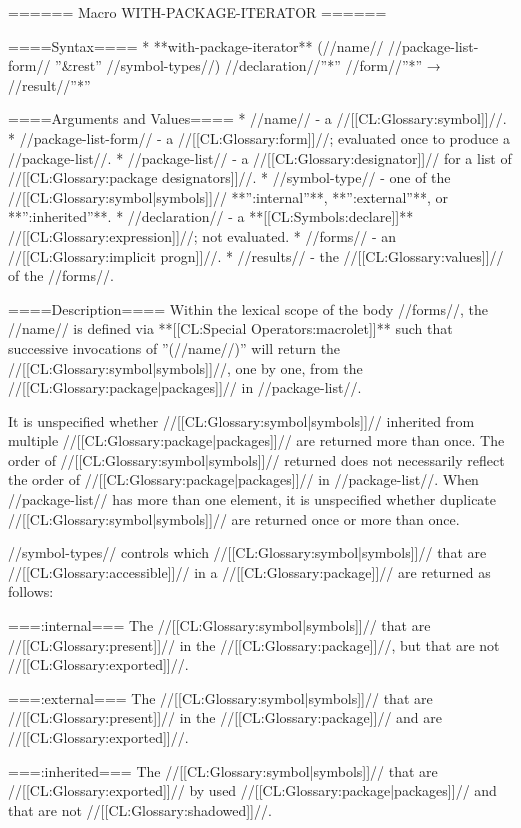 ====== Macro WITH-PACKAGE-ITERATOR ======

====Syntax====
  * **with-package-iterator** (//name// //package-list-form// ''&rest'' //symbol-types//) //declaration//''*'' //form//''*'' → //result//''*''

====Arguments and Values====
  * //name// - a //[[CL:Glossary:symbol]]//.
  * //package-list-form// - a //[[CL:Glossary:form]]//; evaluated once to produce a //package-list//.
  * //package-list// - a //[[CL:Glossary:designator]]// for a list of //[[CL:Glossary:package designators]]//.
  * //symbol-type// - one of the //[[CL:Glossary:symbol|symbols]]// **'':internal''**, **'':external''**, or **'':inherited''**.
  * //declaration// - a **[[CL:Symbols:declare]]** //[[CL:Glossary:expression]]//; not evaluated.
  * //forms// - an //[[CL:Glossary:implicit progn]]//.
  * //results// - the //[[CL:Glossary:values]]// of the //forms//.

====Description====
Within the lexical scope of the body //forms//, the //name// is defined via **[[CL:Special Operators:macrolet]]** such that successive invocations of ''(//name//)'' will return the //[[CL:Glossary:symbol|symbols]]//, one by one, from the //[[CL:Glossary:package|packages]]// in //package-list//.

It is unspecified whether //[[CL:Glossary:symbol|symbols]]// inherited from multiple //[[CL:Glossary:package|packages]]// are returned more than once. The order of //[[CL:Glossary:symbol|symbols]]// returned does not necessarily reflect the order of //[[CL:Glossary:package|packages]]// in //package-list//. When //package-list// has more than one element, it is unspecified whether duplicate //[[CL:Glossary:symbol|symbols]]// are returned once or more than once.

//symbol-types// controls which //[[CL:Glossary:symbol|symbols]]// that are //[[CL:Glossary:accessible]]// in a //[[CL:Glossary:package]]// are returned as follows:

===:internal===
The //[[CL:Glossary:symbol|symbols]]// that are //[[CL:Glossary:present]]// in the //[[CL:Glossary:package]]//, but that are not //[[CL:Glossary:exported]]//.

===:external===
The //[[CL:Glossary:symbol|symbols]]// that are //[[CL:Glossary:present]]// in the //[[CL:Glossary:package]]// and are //[[CL:Glossary:exported]]//.

===:inherited===
The //[[CL:Glossary:symbol|symbols]]// that are //[[CL:Glossary:exported]]// by used //[[CL:Glossary:package|packages]]// and that are not //[[CL:Glossary:shadowed]]//.

